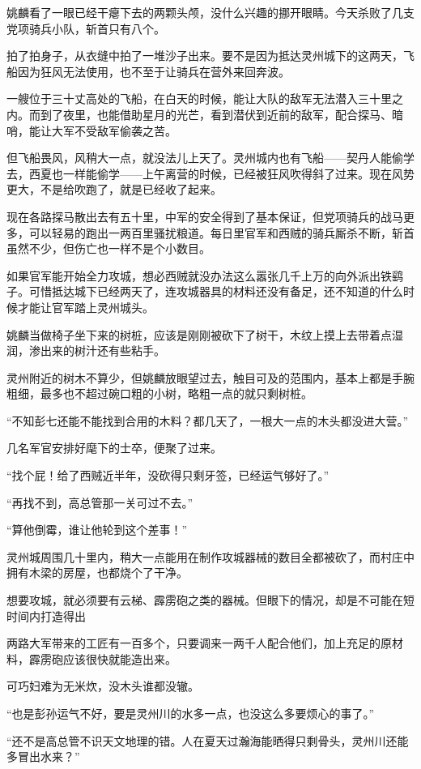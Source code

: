 姚麟看了一眼已经干瘪下去的两颗头颅，没什么兴趣的挪开眼睛。今天杀败了几支党项骑兵小队，斩首只有八个。

拍了拍身子，从衣缝中拍了一堆沙子出来。要不是因为抵达灵州城下的这两天，飞船因为狂风无法使用，也不至于让骑兵在营外来回奔波。

一艘位于三十丈高处的飞船，在白天的时候，能让大队的敌军无法潜入三十里之内。而到了夜里，也能借助星月的光芒，看到潜伏到近前的敌军，配合探马、暗哨，能让大军不受敌军偷袭之苦。

但飞船畏风，风稍大一点，就没法儿上天了。灵州城内也有飞船——契丹人能偷学去，西夏也一样能偷学——上午离营的时候，已经被狂风吹得斜了过来。现在风势更大，不是给吹跑了，就是已经收了起来。

现在各路探马散出去有五十里，中军的安全得到了基本保证，但党项骑兵的战马更多，可以轻易的跑出一两百里骚扰粮道。每日里官军和西贼的骑兵厮杀不断，斩首虽然不少，但伤亡也一样不是个小数目。

如果官军能开始全力攻城，想必西贼就没办法这么嚣张几千上万的向外派出铁鹞子。可惜抵达城下已经两天了，连攻城器具的材料还没有备足，还不知道的什么时候才能让官军踏上灵州城头。

姚麟当做椅子坐下来的树桩，应该是刚刚被砍下了树干，木纹上摸上去带着点湿润，渗出来的树汁还有些粘手。

灵州附近的树木不算少，但姚麟放眼望过去，触目可及的范围内，基本上都是手腕粗细，最多也不超过碗口粗的小树，略粗一点的就只剩树桩。

“不知彭七还能不能找到合用的木料？都几天了，一根大一点的木头都没进大营。”

几名军官安排好麾下的士卒，便聚了过来。

“找个屁！给了西贼近半年，没砍得只剩牙签，已经运气够好了。”

“再找不到，高总管那一关可过不去。”

“算他倒霉，谁让他轮到这个差事！”

灵州城周围几十里内，稍大一点能用在制作攻城器械的数目全都被砍了，而村庄中拥有木梁的房屋，也都烧个了干净。

想要攻城，就必须要有云梯、霹雳砲之类的器械。但眼下的情况，却是不可能在短时间内打造得出

两路大军带来的工匠有一百多个，只要调来一两千人配合他们，加上充足的原材料，霹雳砲应该很快就能造出来。

可巧妇难为无米炊，没木头谁都没辙。

“也是彭孙运气不好，要是灵州川的水多一点，也没这么多要烦心的事了。”

“还不是高总管不识天文地理的错。人在夏天过瀚海能晒得只剩骨头，灵州川还能多冒出水来？”

